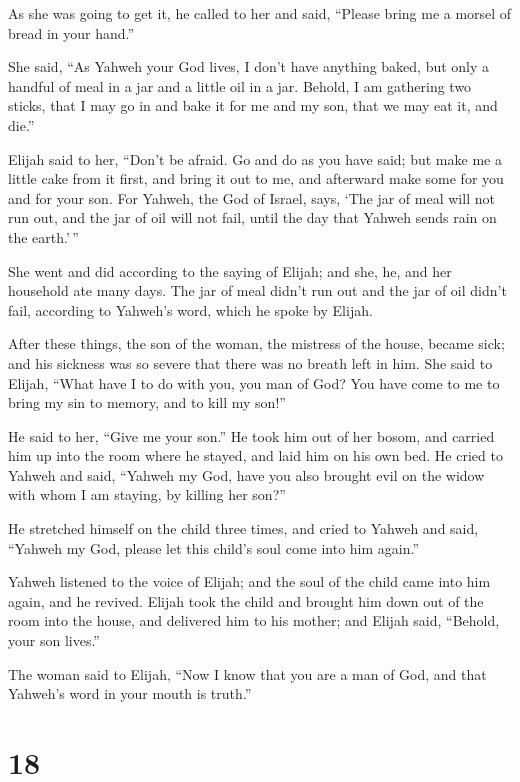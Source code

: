  As she was going to get it, he called to her and said,
``Please bring me a morsel of bread in your hand.''

 She said, ``As Yahweh your God lives, I don't have
anything baked, but only a handful of meal in a jar and a little oil in
a jar. Behold, I am gathering two sticks, that I may go in and bake it
for me and my son, that we may eat it, and die.''

 Elijah said to her, ``Don't be afraid. Go and do as you
have said; but make me a little cake from it first, and bring it out to
me, and afterward make some for you and for your son.  For
Yahweh, the God of Israel, says, `The jar of meal will not run out, and
the jar of oil will not fail, until the day that Yahweh sends rain on
the earth.'\,''

 She went and did according to the saying of Elijah; and
she, he, and her household ate many days.  The jar of meal
didn't run out and the jar of oil didn't fail, according to Yahweh's
word, which he spoke by Elijah.

 After these things, the son of the woman, the mistress of
the house, became sick; and his sickness was so severe that there was no
breath left in him.  She said to Elijah, ``What have I to
do with you, you man of God? You have come to me to bring my sin to
memory, and to kill my son!''

 He said to her, ``Give me your son.'' He took him out of
her bosom, and carried him up into the room where he stayed, and laid
him on his own bed.  He cried to Yahweh and said, ``Yahweh
my God, have you also brought evil on the widow with whom I am staying,
by killing her son?''

 He stretched himself on the child three times, and cried
to Yahweh and said, ``Yahweh my God, please let this child's soul come
into him again.''

 Yahweh listened to the voice of Elijah; and the soul of
the child came into him again, and he revived.  Elijah took
the child and brought him down out of the room into the house, and
delivered him to his mother; and Elijah said, ``Behold, your son
lives.''

 The woman said to Elijah, ``Now I know that you are a man
of God, and that Yahweh's word in your mouth is truth.''

\hypertarget{section-17}{%
\section{18}\label{section-17}}


